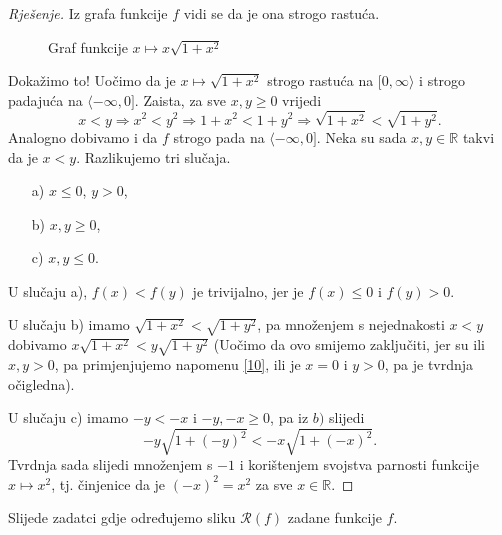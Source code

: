 \begin{proof}[Rješenje]
Iz grafa funkcije $f$ vidi se da je ona strogo rastuća.
\begin{figure}[ht]
\begin{center}
\end{center}
\caption{\label{gr4} Graf funkcije $x\mapsto x\sqrt{1+x^2}$}
\end{figure}

Dokažimo to! Uočimo da je $x\mapsto \sqrt{1+x^2}$ strogo rastuća na $[0, \infty\rangle$ i strogo padajuća na $\langle-\infty, 0]$. Zaista, za sve $x, y\geq 0$ vrijedi
$$x<y\Rightarrow x^2<y^2\Rightarrow 1+x^2<1+y^2\Rightarrow \sqrt{1+x^2}<\sqrt{1+y^2}.$$
Analogno dobivamo i da $f$ strogo pada na $\langle-\infty, 0]$. Neka su sada $x, y\in \mathbb{R}$ takvi da je $x<y$. Razlikujemo tri slučaja.

\begin{itemize}
\item[a)] $x\leq 0$, $y>0$,
\item[b)] $x, y\geq 0$,
\item[c)] $x, y\leq 0$.
\end{itemize}

U slučaju a), $f(x)<f(y)$ je trivijalno, jer je $f(x)\leq 0$ i $f(y)>0$. 

U slučaju b) imamo $\sqrt{1+x^2}<\sqrt{1+y^2}$, pa množenjem s nejednakosti $x<y$ dobivamo $x\sqrt{1+x^2}<y\sqrt{1+y^2}$ (Uočimo da ovo smijemo zaključiti, jer su ili $x, y>0$, pa primjenjujemo napomenu \ref{10}, ili je $x=0$ i $y>0$, pa je tvrdnja očigledna).

U slučaju c) imamo $-y<-x$ i $-y, -x\geq 0$, pa iz $b)$ slijedi $$-y\sqrt{1+(-y)^2}<-x\sqrt{1+(-x)^2}.$$ Tvrdnja sada slijedi množenjem s $-1$ i korištenjem svojstva parnosti funkcije $x\mapsto x^2$, tj. činjenice da je $(-x)^2=x^2$ za sve $x\in \mathbb{R}$.
\end{proof}
Slijede zadatci gdje određujemo sliku $\mathcal{R}(f)$ zadane funkcije $f$.

